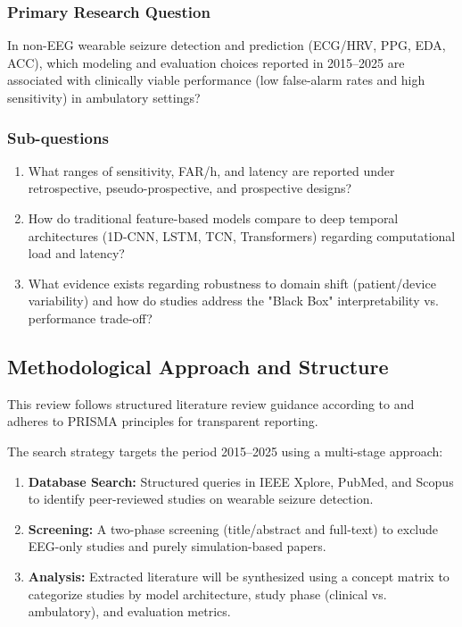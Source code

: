 \subsubsection{Primary Research Question}
In non-EEG wearable seizure detection and prediction
(ECG/HRV, PPG, EDA, ACC), which modeling and evaluation choices
reported in 2015--2025 are associated with clinically viable
performance (low false-alarm rates and high sensitivity) in ambulatory
settings?

\subsubsection{Sub-questions}
\begin{enumerate}
  \item What ranges of sensitivity, FAR/h, and latency are reported under
    retrospective, pseudo-prospective, and prospective designs?
  \item How do traditional feature-based models compare to deep temporal
    architectures (1D-CNN, LSTM, TCN, Transformers) regarding
    computational load and latency?
  \item What evidence exists regarding robustness to domain shift
    (patient/device variability) and how do studies address the
    "Black Box" interpretability vs. performance trade-off?
\end{enumerate}

\subsection{Methodological Approach and Structure}
This review follows structured literature review guidance according to
\cite{websterAnalyzingPastDetermine2002} and adheres to PRISMA principles
for transparent reporting.

The search strategy targets the period 2015--2025 using a multi-stage
approach:
\begin{enumerate}
  \item \textbf{Database Search:} Structured queries in IEEE Xplore,
    PubMed, and Scopus to identify peer-reviewed studies on wearable
    seizure detection.
  \item \textbf{Screening:} A two-phase screening (title/abstract and
    full-text) to exclude EEG-only studies and purely simulation-based
    papers.
  \item \textbf{Analysis:} Extracted literature will be synthesized
    using a concept matrix to categorize studies by model
    architecture, study phase (clinical vs. ambulatory), and
    evaluation metrics.
\end{enumerate}


